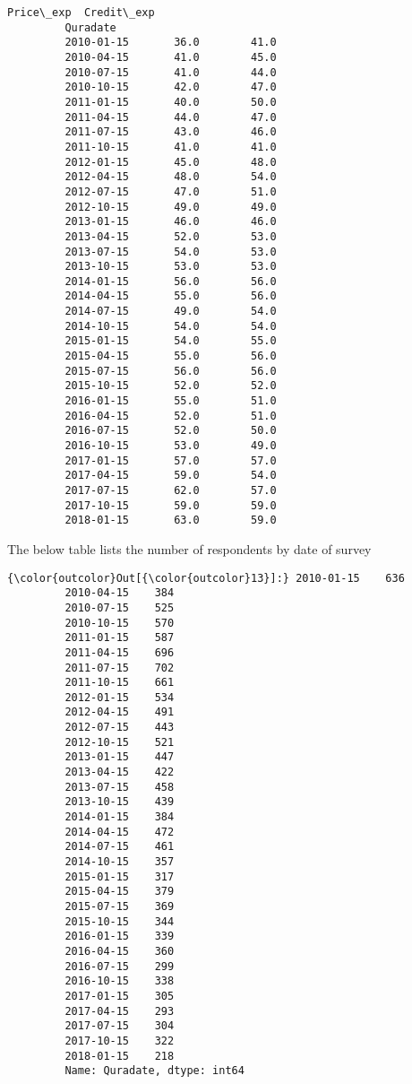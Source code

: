 \documentclass[11pt]{article}
\begin{document}
\begin{Verbatim}[commandchars=\\\{\}]
                     Price\_exp  Credit\_exp  
         Quradate                           
         2010-01-15       36.0        41.0  
         2010-04-15       41.0        45.0  
         2010-07-15       41.0        44.0  
         2010-10-15       42.0        47.0  
         2011-01-15       40.0        50.0  
         2011-04-15       44.0        47.0  
         2011-07-15       43.0        46.0  
         2011-10-15       41.0        41.0  
         2012-01-15       45.0        48.0  
         2012-04-15       48.0        54.0  
         2012-07-15       47.0        51.0  
         2012-10-15       49.0        49.0  
         2013-01-15       46.0        46.0  
         2013-04-15       52.0        53.0  
         2013-07-15       54.0        53.0  
         2013-10-15       53.0        53.0  
         2014-01-15       56.0        56.0  
         2014-04-15       55.0        56.0  
         2014-07-15       49.0        54.0  
         2014-10-15       54.0        54.0  
         2015-01-15       54.0        55.0  
         2015-04-15       55.0        56.0  
         2015-07-15       56.0        56.0  
         2015-10-15       52.0        52.0  
         2016-01-15       55.0        51.0  
         2016-04-15       52.0        51.0  
         2016-07-15       52.0        50.0  
         2016-10-15       53.0        49.0  
         2017-01-15       57.0        57.0  
         2017-04-15       59.0        54.0  
         2017-07-15       62.0        57.0  
         2017-10-15       59.0        59.0  
         2018-01-15       63.0        59.0  
\end{Verbatim}
            
    The below table lists the number of respondents by date of survey


\begin{Verbatim}[commandchars=\\\{\}]
{\color{outcolor}Out[{\color{outcolor}13}]:} 2010-01-15    636
         2010-04-15    384
         2010-07-15    525
         2010-10-15    570
         2011-01-15    587
         2011-04-15    696
         2011-07-15    702
         2011-10-15    661
         2012-01-15    534
         2012-04-15    491
         2012-07-15    443
         2012-10-15    521
         2013-01-15    447
         2013-04-15    422
         2013-07-15    458
         2013-10-15    439
         2014-01-15    384
         2014-04-15    472
         2014-07-15    461
         2014-10-15    357
         2015-01-15    317
         2015-04-15    379
         2015-07-15    369
         2015-10-15    344
         2016-01-15    339
         2016-04-15    360
         2016-07-15    299
         2016-10-15    338
         2017-01-15    305
         2017-04-15    293
         2017-07-15    304
         2017-10-15    322
         2018-01-15    218
         Name: Quradate, dtype: int64
\end{Verbatim}
            
\end{document}
